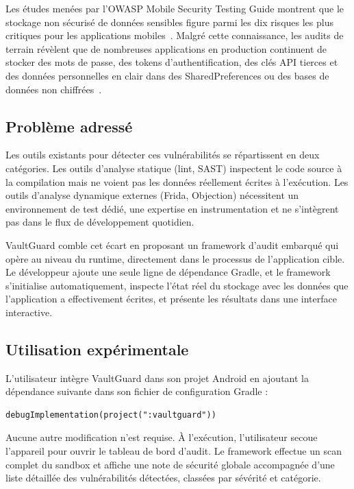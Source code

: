 \documentclass[preprint,12pt, a4paper]{elsarticle}
\begin{document}
Les études menées par l'OWASP Mobile Security Testing Guide montrent que le stockage non sécurisé de données sensibles figure parmi les dix risques les plus critiques pour les applications mobiles~\cite{owasp_top10}. Malgré cette connaissance, les audits de terrain révèlent que de nombreuses applications en production continuent de stocker des mots de passe, des tokens d'authentification, des clés API tierces et des données personnelles en clair dans des SharedPreferences ou des bases de données non chiffrées~\cite{insecure_storage_study}.

\subsection{Problème adressé}

Les outils existants pour détecter ces vulnérabilités se répartissent en deux catégories. Les outils d'analyse statique (lint, SAST) inspectent le code source à la compilation mais ne voient pas les données réellement écrites à l'exécution. Les outils d'analyse dynamique externes (Frida, Objection) nécessitent un environnement de test dédié, une expertise en instrumentation et ne s'intègrent pas dans le flux de développement quotidien.

VaultGuard comble cet écart en proposant un framework d'audit embarqué qui opère au niveau du runtime, directement dans le processus de l'application cible. Le développeur ajoute une seule ligne de dépendance Gradle, et le framework s'initialise automatiquement, inspecte l'état réel du stockage avec les données que l'application a effectivement écrites, et présente les résultats dans une interface interactive.

\subsection{Utilisation expérimentale}

L'utilisateur intègre VaultGuard dans son projet Android en ajoutant la dépendance suivante dans son fichier de configuration Gradle :

\begin{lstlisting}[style=kotlin]
debugImplementation(project(":vaultguard"))
\end{lstlisting}

Aucune autre modification n'est requise. À l'exécution, l'utilisateur secoue l'appareil pour ouvrir le tableau de bord d'audit. Le framework effectue un scan complet du sandbox et affiche une note de sécurité globale accompagnée d'une liste détaillée des vulnérabilités détectées, classées par sévérité et catégorie.
\end{document}
